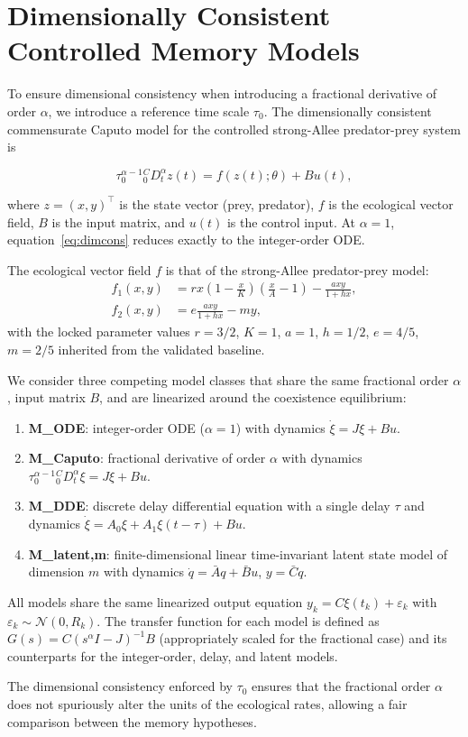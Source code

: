 \section{Dimensionally Consistent Controlled Memory Models}
\label{sec:models}

To ensure dimensional consistency when introducing a fractional derivative of order \(\alpha\), we introduce a reference time scale \(\tau_0\).
The dimensionally consistent commensurate Caputo model for the controlled strong-Allee predator-prey system is

\begin{equation}
\tau_0^{\alpha-1} {}_{0}^{C}D_{t}^{\alpha} z(t) = f(z(t);\theta) + B u(t),
\label{eq:dimcons}
\end{equation}

where \(z=(x,y)^\top\) is the state vector (prey, predator), \(f\) is the ecological vector field, \(B\) is the input matrix, and \(u(t)\) is the control input.
At \(\alpha=1\), equation~\eqref{eq:dimcons} reduces exactly to the integer-order ODE.

The ecological vector field \(f\) is that of the strong-Allee predator-prey model:
\begin{align}
f_1(x,y) &= r x \left(1-\frac{x}{K}\right) \left(\frac{x}{A}-1\right) - \frac{a x y}{1 + h x},\\
f_2(x,y) &= e \frac{a x y}{1 + h x} - m y,
\end{align}
with the locked parameter values \(r=3/2\), \(K=1\), \(a=1\), \(h=1/2\), \(e=4/5\), \(m=2/5\) inherited from the validated baseline.

We consider three competing model classes that share the same fractional order \(\alpha\), input matrix \(B\), and are linearized around the coexistence equilibrium:
\begin{enumerate}
    \item \textbf{M\_ODE}: integer-order ODE (\(\alpha=1\)) with dynamics \(\dot{\xi} = J \xi + B u\).
    \item \textbf{M\_Caputo}: fractional derivative of order \(\alpha\) with dynamics \(\tau_0^{\alpha-1} {}_{0}^{C}D_{t}^{\alpha} \xi = J \xi + B u\).
    \item \textbf{M\_DDE}: discrete delay differential equation with a single delay \(\tau\) and dynamics \(\dot{\xi} = A_0 \xi + A_1 \xi(t-\tau) + B u\).
    \item \textbf{M\_latent,m}: finite-dimensional linear time-invariant latent state model of dimension \(m\) with dynamics \(\dot{q} = \bar{A} q + \bar{B} u\), \(y = \bar{C} q\).
\end{enumerate}

All models share the same linearized output equation \(y_k = C \xi(t_k) + \varepsilon_k\) with \(\varepsilon_k \sim \mathcal{N}(0, R_k)\).
The transfer function for each model is defined as \(G(s) = C (s^{\alpha} I - J)^{-1} B\) (appropriately scaled for the fractional case) and its counterparts for the integer-order, delay, and latent models.

The dimensional consistency enforced by \(\tau_0\) ensures that the fractional order \(\alpha\) does not spuriously alter the units of the ecological rates, allowing a fair comparison between the memory hypotheses.